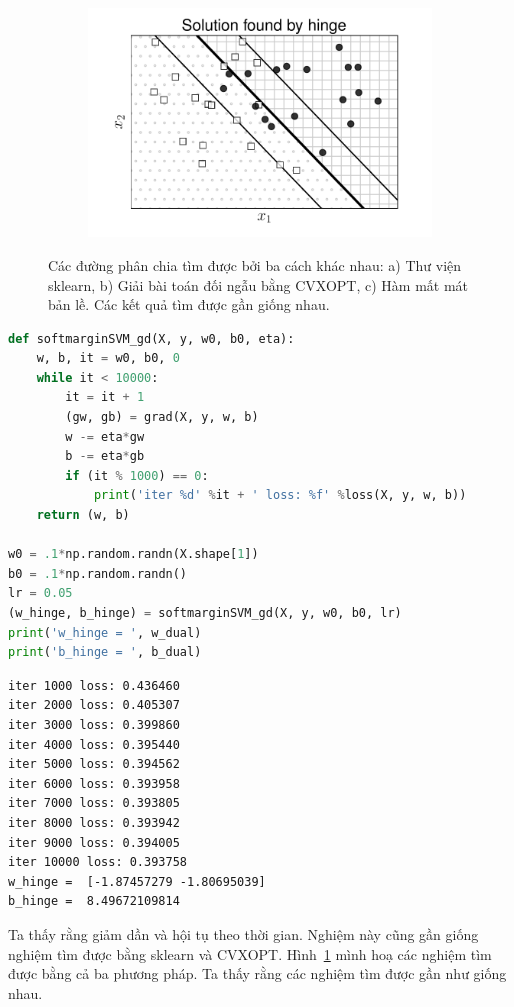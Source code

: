 \begin{figure}[t]
\begin{subfigure}{0.325\textwidth}
\includegraphics[width=\linewidth]{ebookML_src/src/softmargin_svm/svm_hinge.pdf}
\caption{}
\end{subfigure}

\caption{Các đường phân chia tìm được bởi ba cách khác nhau: a) Thư viện
sklearn, b) Giải bài toán đối ngẫu bằng CVXOPT, c) Hàm mất mát bản lề. Các kết
quả tìm được gần giống nhau.}
\label{fig:20_5}
\end{figure}

\begin{lstlisting}[language=Python]
def softmarginSVM_gd(X, y, w0, b0, eta):
    w, b, it = w0, b0, 0
    while it < 10000:
        it = it + 1
        (gw, gb) = grad(X, y, w, b)
        w -= eta*gw
        b -= eta*gb
        if (it % 1000) == 0:
            print('iter %d' %it + ' loss: %f' %loss(X, y, w, b))
    return (w, b)

w0 = .1*np.random.randn(X.shape[1])
b0 = .1*np.random.randn()
lr = 0.05
(w_hinge, b_hinge) = softmarginSVM_gd(X, y, w0, b0, lr)
print('w_hinge = ', w_dual)
print('b_hinge = ', b_dual)
\end{lstlisting}
\kq
\begin{lstlisting}
iter 1000 loss: 0.436460
iter 2000 loss: 0.405307
iter 3000 loss: 0.399860
iter 4000 loss: 0.395440
iter 5000 loss: 0.394562
iter 6000 loss: 0.393958
iter 7000 loss: 0.393805
iter 8000 loss: 0.393942
iter 9000 loss: 0.394005
iter 10000 loss: 0.393758
w_hinge =  [-1.87457279 -1.80695039]
b_hinge =  8.49672109814
\end{lstlisting}
Ta thấy rằng  giảm dần và hội tụ theo thời gian. Nghiệm này cũng gần giống nghiệm tìm được bằng sklearn và CVXOPT.
Hình~\ref{fig:20_5} mình hoạ các nghiệm tìm được bằng cả ba phương pháp.
Ta thấy rằng các nghiệm tìm được gần như giống nhau.


